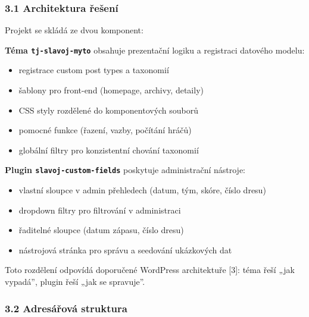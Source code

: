 \subsubsection{3.1 Architektura
řešení}\label{architektura-ux159eux161enuxed}

Projekt se skládá ze dvou komponent:

\textbf{Téma \texttt{tj-slavoj-myto}} obsahuje prezentační logiku a
registraci datového modelu:

\begin{itemize}
\tightlist
\item
  registrace custom post types a taxonomií
\item
  šablony pro front-end (homepage, archivy, detaily)
\item
  CSS styly rozdělené do komponentových souborů
\item
  pomocné funkce (řazení, vazby, počítání hráčů)
\item
  globální filtry pro konzistentní chování taxonomií
\end{itemize}

\textbf{Plugin \texttt{slavoj-custom-fields}} poskytuje administrační
nástroje:

\begin{itemize}
\tightlist
\item
  vlastní sloupce v admin přehledech (datum, tým, skóre, číslo dresu)
\item
  dropdown filtry pro filtrování v administraci
\item
  řaditelné sloupce (datum zápasu, číslo dresu)
\item
  nástrojová stránka pro správu a seedování ukázkových dat
\end{itemize}

Toto rozdělení odpovídá doporučené WordPress architektuře {[}3{]}: téma
řeší „jak vypadá'', plugin řeší „jak se spravuje''.

\subsubsection{3.2 Adresářová
struktura}\label{adresuxe1ux159ovuxe1-struktura}

